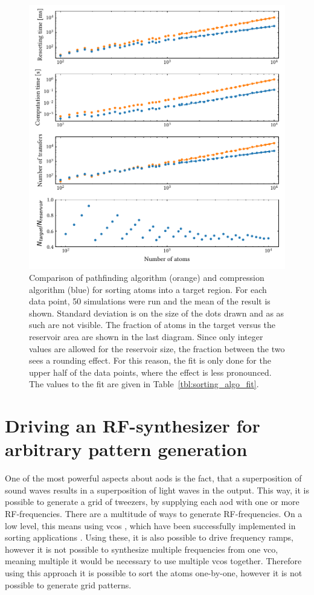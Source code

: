\begin{figure}[h]
\label{fig:sorting_algos}
\centering
	\includegraphics{figures/sorting_algos_155.pdf}
	\caption{Comparison of pathfinding algorithm (orange) and compression algorithm (blue) for sorting atoms into a target region. For each data point, 50 simulations were run and the mean of the result is shown. Standard deviation is on the size of the dots drawn and as as such are not visible. The fraction of atoms in the target versus the reservoir area are shown in the last diagram. Since only integer values are allowed for the reservoir size, the fraction between the two sees a rounding effect. For this reason, the fit is only done for the upper half of the data points, where the effect is less pronounced. The values to the fit are given in Table~\ref{tbl:sorting_algo_fit}.}
\end{figure}

\section{Driving an RF-synthesizer for arbitrary pattern generation}

One of the most powerful aspects about \acp{aod} is the fact, that a superposition of sound waves results in a superposition of light waves in the output. This way, it is possible to generate a grid of tweezers, by supplying each \ac{aod} with one or more RF-frequencies. There are a multitude of ways to generate RF-frequencies. On a low level, this means using \acp{vco} , which have been successfully implemented in sorting applications . Using these, it is also possible to drive frequency ramps, however it is not possible to synthesize multiple frequencies from one \ac{vco}, meaning multiple it would be necessary to use multiple \acp{vco} together. Therefore using this approach it is possible to sort the atoms one-by-one, however it is not possible to generate grid patterns.

